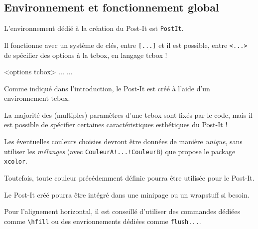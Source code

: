 \documentclass[french,a4paper,11pt]{article}
\begin{document}
\subsection{Environnement et fonctionnement global}

\begin{cautionblock}
L'environnement dédié à la création du Post-It est \texttt{PostIt}.

Il fonctionne avec un système de clés, entre \texttt{[...]} et il est possible, entre \texttt{<...>} de spécifier des options à la \textsf{tcbox}, en langage \textsf{tcbox} !
\end{cautionblock}

\begin{DemoCode}
\begin{PostIt}[clés]<options tcbox>
...
...
\end{PostIt}
\end{DemoCode}

\begin{noteblock}
Comme indiqué dans l'introduction, le Post-It est créé à l'aide d'un environnement \textsf{tcbox}.

La majorité des (multiples) paramètres d'une \textsf{tcbox} sont fixés par le code, mais il est possible de spécifier certaines caractéristiques esthétiques du Post-It !
\end{noteblock}

\begin{DemoCode}[]
\begin{PostIt}
\lipsum[1][1-2]
\end{PostIt}
\end{DemoCode}

\begin{tipblock}
Les éventuelles couleurs choisies devront être données de manière \textit{unique}, sans utiliser les \textit{mélanges} (avec \texttt{CouleurA!...!CouleurB}) que propose le package \texttt{xcolor}. 

Toutefois, toute couleur précédemment définie pourra être utilisée pour le Post-It.
\end{tipblock}

\begin{tipblock}
Le Post-It créé pourra être intégré dans une \textsf{minipage} ou un \textsf{wrapstuff} si besoin.

Pour l'alignement horizontal, il est conseillé d'utiliser des commandes dédiées comme \texttt{\textbackslash hfill} ou des envrionnements dédiées comme \texttt{flush...}.
\end{tipblock}
\end{document}
